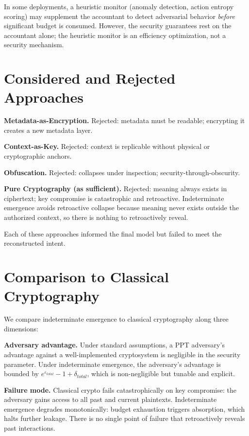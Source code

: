 \documentclass[11pt,a4paper]{article}
\begin{document}
In some deployments, a heuristic monitor (anomaly detection, action entropy scoring) may supplement the accountant to detect adversarial behavior \textit{before} significant budget is consumed. However, the security guarantees rest on the accountant alone; the heuristic monitor is an efficiency optimization, not a security mechanism.

\section{Considered and Rejected Approaches}

\textbf{Metadata-as-Encryption.} Rejected: metadata must be readable; encrypting it creates a new metadata layer.

\textbf{Context-as-Key.} Rejected: context is replicable without physical or cryptographic anchors.

\textbf{Obfuscation.} Rejected: collapses under inspection; security-through-obscurity.

\textbf{Pure Cryptography (as sufficient).} Rejected: meaning always exists in ciphertext; key compromise is catastrophic and retroactive. Indeterminate emergence avoids retroactive collapse because meaning never exists outside the authorized context, so there is nothing to retroactively reveal.

Each of these approaches informed the final model but failed to meet the reconstructed intent.

\section{Comparison to Classical Cryptography}

We compare indeterminate emergence to classical cryptography along three dimensions:

\textbf{Adversary advantage.} Under standard assumptions, a PPT adversary's advantage against a well-implemented cryptosystem is negligible in the security parameter. Under indeterminate emergence, the adversary's advantage is bounded by $e^{\varepsilon_{total}} - 1 + \delta_{total}$, which is non-negligible but tunable and explicit.

\textbf{Failure mode.} Classical crypto fails catastrophically on key compromise: the adversary gains access to all past and current plaintexts. Indeterminate emergence degrades monotonically: budget exhaustion triggers absorption, which halts further leakage. There is no single point of failure that retroactively reveals past interactions.
\end{document}
